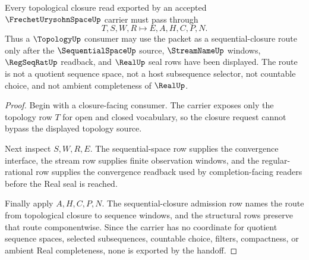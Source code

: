 \begin{theorem}\label{thm:frechet-urysohn-space-sequential-closure-route}
Every topological closure read exported by an accepted $\FrechetUrysohnSpaceUp$ carrier must pass through
$$
T,S,W,R \longmapsto E,A,H,C,P,N .
$$
Thus a $\TopologyUp$ consumer may use the packet as a sequential-closure route only after the $\SequentialSpaceUp$ source, $\StreamNameUp$ windows, $\RegSeqRatUp$ readback, and $\RealUp$ seal rows have been displayed. The route is not a quotient sequence space, not a host subsequence selector, not countable choice, and not ambient completeness of $\RealUp$.
\end{theorem}
\begin{proof}
Begin with a closure-facing consumer. The carrier exposes only the topology row $T$ for open and closed vocabulary, so the closure request cannot bypass the displayed topology source.

Next inspect $S,W,R,E$. The sequential-space row supplies the convergence interface, the stream row supplies finite observation windows, and the regular-rational row supplies the convergence readback used by completion-facing readers before the Real seal is reached.

Finally apply $A,H,C,P,N$. The sequential-closure admission row names the route from topological closure to sequence windows, and the structural rows preserve that route componentwise. Since the carrier has no coordinate for quotient sequence spaces, selected subsequences, countable choice, filters, compactness, or ambient Real completeness, none is exported by the handoff.
\end{proof}


\begin{closurestatus}{\FrechetUrysohnSpaceUp}
  \theoryclosure{\seedClosure}
  \formalstatus{\unformalizedV}
\end{closurestatus}
